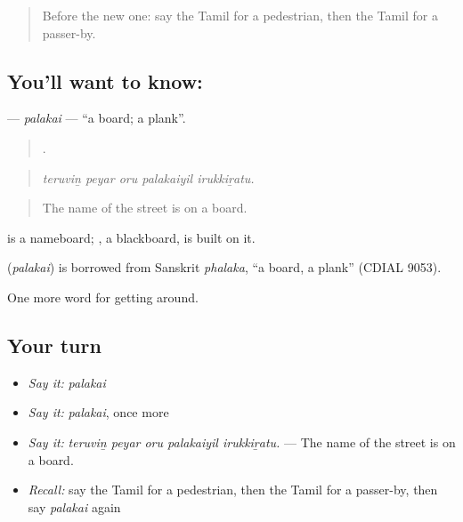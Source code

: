 \label{lesson:TA-C410-palakai}



\begin{quote}
Before the new one: say the Tamil for a pedestrian, then the Tamil for a passer-by.
\end{quote}

\subsection*{You'll want to know: }
\textbf{} — \emph{palakai} — \textquotedblleft{}a board; a plank\textquotedblright{}.

\begin{quote}
    .
\end{quote}

\begin{quote}
\emph{teruviṉ peyar oru palakaiyil irukkiṟatu.}
\end{quote}

\begin{quote}
The name of the street is on a board.
\end{quote}

  is a nameboard; , a blackboard, is built on it.

\begin{cousinweb}
\textbf{} (\emph{palakai}) is borrowed from Sanskrit \emph{phalaka}, \textquotedblleft{}a board, a plank\textquotedblright{} (CDIAL 9053).
\end{cousinweb}

\begin{grammarlens}[title={What you've built}]
One more word for getting around.
\end{grammarlens}

\subsection*{Your turn}
\begin{itemize}
\raggedright
  \item \emph{Say it:} \emph{palakai}
  \item \emph{Say it:} \emph{palakai}, once more
  \item \emph{Say it:} \emph{teruviṉ peyar oru palakaiyil irukkiṟatu.} — The name of the street is on a board.
  \item \emph{Recall:} say the Tamil for a pedestrian, then the Tamil for a passer-by, then say \emph{palakai} again
\end{itemize}


